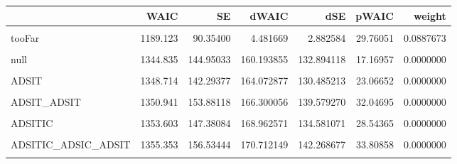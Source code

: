 \documentclass[10pt,dvipsnames,enabledeprecatedfontcommands]{scrartcl}
\begin{document}
\begin{table}
\centering\begingroup\fontsize{9}{11}\selectfont

\begin{tabular}{lrrrrrr}
\toprule
  & WAIC & SE & dWAIC & dSE & pWAIC & weight\\
\midrule
\cellcolor{gray!6}{Final} & \cellcolor{gray!6}{1184.641} & \cellcolor{gray!6}{89.47387} & \cellcolor{gray!6}{0.000000} & \cellcolor{gray!6}{NA} & \cellcolor{gray!6}{26.85809} & \cellcolor{gray!6}{0.8345169}\\
tooFar & 1189.123 & 90.35400 & 4.481669 & 2.882584 & 29.76051 & 0.0887673\\
\cellcolor{gray!6}{ADSITICCBS\_ITIC\_ADSIC} & \cellcolor{gray!6}{1189.414} & \cellcolor{gray!6}{87.19709} & \cellcolor{gray!6}{4.773490} & \cellcolor{gray!6}{5.762571} & \cellcolor{gray!6}{25.62296} & \cellcolor{gray!6}{0.0767158}\\
null & 1344.835 & 144.95033 & 160.193855 & 132.894118 & 17.16957 & 0.0000000\\
\cellcolor{gray!6}{IT} & \cellcolor{gray!6}{1345.879} & \cellcolor{gray!6}{144.64185} & \cellcolor{gray!6}{161.237934} & \cellcolor{gray!6}{132.478842} & \cellcolor{gray!6}{19.27433} & \cellcolor{gray!6}{0.0000000}\\
\addlinespace
ADSIT & 1348.714 & 142.29377 & 164.072877 & 130.485213 & 23.06652 & 0.0000000\\
\cellcolor{gray!6}{ADS} & \cellcolor{gray!6}{1349.706} & \cellcolor{gray!6}{145.13624} & \cellcolor{gray!6}{165.065051} & \cellcolor{gray!6}{133.323101} & \cellcolor{gray!6}{23.10634} & \cellcolor{gray!6}{0.0000000}\\
ADSIT\_ADSIT & 1350.941 & 153.88118 & 166.300056 & 139.579270 & 32.04695 & 0.0000000\\
\cellcolor{gray!6}{ADSITIC\_ADSIC} & \cellcolor{gray!6}{1352.972} & \cellcolor{gray!6}{154.55405} & \cellcolor{gray!6}{168.331385} & \cellcolor{gray!6}{140.054704} & \cellcolor{gray!6}{30.65579} & \cellcolor{gray!6}{0.0000000}\\
ADSITIC & 1353.603 & 147.38084 & 168.962571 & 134.581071 & 28.54365 & 0.0000000\\
\addlinespace
\cellcolor{gray!6}{ADSIC} & \cellcolor{gray!6}{1355.210} & \cellcolor{gray!6}{148.15271} & \cellcolor{gray!6}{170.568848} & \cellcolor{gray!6}{135.609996} & \cellcolor{gray!6}{27.22326} & \cellcolor{gray!6}{0.0000000}\\
ADSITIC\_ADSIC\_ADSIT & 1355.353 & 156.53444 & 170.712149 & 142.268677 & 33.80858 & 0.0000000\\
\cellcolor{gray!6}{ADSITIC\_ADSIT\_ITIC\_ADSIC} & \cellcolor{gray!6}{1355.442} & \cellcolor{gray!6}{155.55820} & \cellcolor{gray!6}{170.800602} & \cellcolor{gray!6}{140.950680} & \cellcolor{gray!6}{34.03861} & \cellcolor{gray!6}{0.0000000}\\
\bottomrule
\end{tabular}
\endgroup{}
\end{table}
\end{document}
